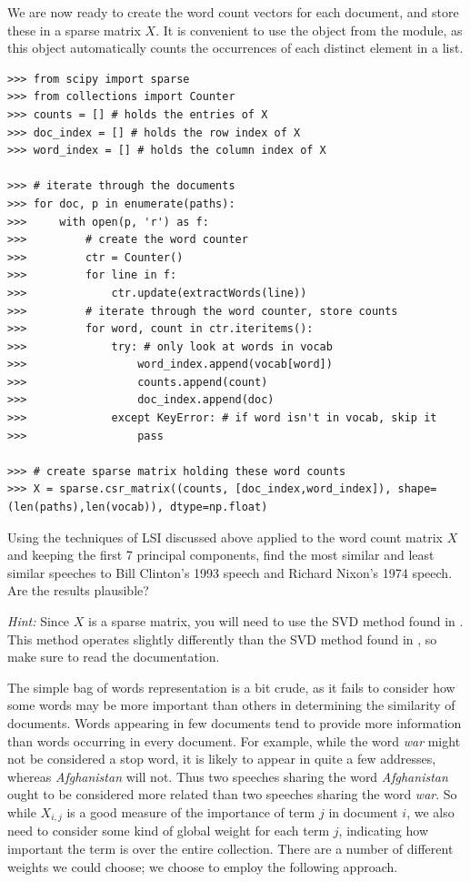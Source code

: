 We are now ready to create the word count vectors for each document, and store these in a sparse matrix $X$.
It is convenient to use the  object from the  module, as this
object automatically counts the occurrences of each distinct element in a list.
\begin{lstlisting}
>>> from scipy import sparse
>>> from collections import Counter
>>> counts = [] # holds the entries of X
>>> doc_index = [] # holds the row index of X
>>> word_index = [] # holds the column index of X

>>> # iterate through the documents
>>> for doc, p in enumerate(paths):
>>>     with open(p, 'r') as f:
>>>         # create the word counter
>>>         ctr = Counter()
>>>         for line in f:
>>>             ctr.update(extractWords(line))
>>>         # iterate through the word counter, store counts
>>>         for word, count in ctr.iteritems():
>>>             try: # only look at words in vocab
>>>                 word_index.append(vocab[word])
>>>                 counts.append(count)
>>>                 doc_index.append(doc)
>>>             except KeyError: # if word isn't in vocab, skip it
>>>                 pass

>>> # create sparse matrix holding these word counts
>>> X = sparse.csr_matrix((counts, [doc_index,word_index]), shape=(len(paths),len(vocab)), dtype=np.float)
\end{lstlisting}

\begin{problem}
Using the techniques of LSI discussed above applied to the word count matrix $X$ and keeping the first 7 principal components,
find the most similar and least similar speeches to Bill Clinton's 1993 speech and Richard Nixon's 1974 speech.
Are the results plausible?

\emph{Hint:} Since $X$ is a sparse matrix, you will need to use the SVD method found in .
This method operates slightly differently than the SVD method found in , so make sure to read the
documentation.
\label{prob:LSI1}
\end{problem}

The simple bag of words representation is a bit crude, as it fails to consider how some words may be more important than others
in determining the similarity of documents.
Words appearing in few documents tend
to provide more information than words occurring in every document.
For example, while the word \emph{war} might not be considered a stop word,
it is likely to appear in quite a few addresses, whereas \emph{Afghanistan} will not.
Thus two speeches sharing the word \emph{Afghanistan} ought to be considered more
related than two speeches sharing the word \emph{war}.
So while $X_{i,j}$ is a good measure of the importance of term $j$ in document $i$,
we also need to consider some kind of global weight for each term $j$,
indicating how important the term is over the entire collection.
There are a number of different weights we could choose; we choose to employ
the following approach.

